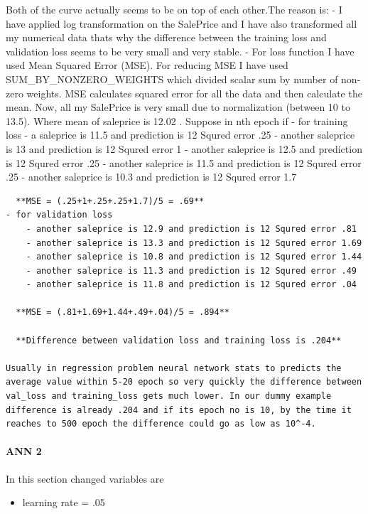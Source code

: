 \documentclass[11pt, a4paper , landscape]{article}
\providecommand{\tightlist}{%
      \setlength{\itemsep}{0pt}\setlength{\parskip}{0pt}}
\begin{document}
    Both of the curve actually seems to be on top of each other.The reason
is: - I have applied log transformation on the SalePrice and I have also
transformed all my numerical data thats why the difference between the
training loss and validation loss seems to be very small and very
stable. - For loss function I have used Mean Squared Error (MSE). For
reducing MSE I have used SUM\_BY\_NONZERO\_WEIGHTS which divided scalar
sum by number of non-zero weights. MSE calculates squared error for all
the data and then calculate the mean. Now, all my SalePrice is very
small due to normalization (between 10 to 13.5). Where mean of saleprice
is 12.02 . Suppose in nth epoch if - for training loss - a saleprice is
11.5 and prediction is 12 Squred error .25 - another saleprice is 13 and
prediction is 12 Squred error 1 - another saleprice is 12.5 and
prediction is 12 Squred error .25 - another saleprice is 11.5 and
prediction is 12 Squred error .25 - another saleprice is 10.3 and
prediction is 12 Squred error 1.7

\begin{verbatim}
  **MSE = (.25+1+.25+.25+1.7)/5 = .69**
- for validation loss
    - another saleprice is 12.9 and prediction is 12 Squred error .81
    - another saleprice is 13.3 and prediction is 12 Squred error 1.69
    - another saleprice is 10.8 and prediction is 12 Squred error 1.44
    - another saleprice is 11.3 and prediction is 12 Squred error .49
    - another saleprice is 11.8 and prediction is 12 Squred error .04
    
  **MSE = (.81+1.69+1.44+.49+.04)/5 = .894**
  
  **Difference between validation loss and training loss is .204**
  
Usually in regression problem neural network stats to predicts the average value within 5-20 epoch so very quickly the difference between val_loss and training_loss gets much lower. In our dummy example difference is already .204 and if its epoch no is 10, by the time it reaches to 500 epoch the difference could go as low as 10^-4.
\end{verbatim}

    \paragraph{ANN 2}\label{ann-2}

In this section changed variables are

\begin{itemize}
\tightlist
\item
  learning rate = .05
\end{itemize}
\end{document}
